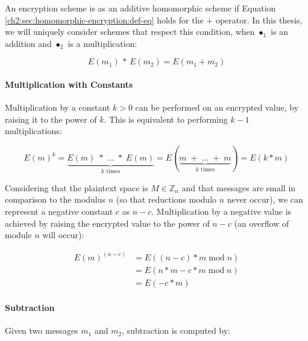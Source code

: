 \begin{definition}\label{ch2:definition:he-additive} An encryption scheme is as an additive homomorphic scheme if Equation \ref{ch2:sec:homomorphic-encryption:def-eq} holds for the $+$ operator. In this thesis, we will uniquely consider schemes that respect this condition, when $\bullet_1$ is an addition and $\bullet_2$ is a multiplication:

\begin{equation}\label{ch2:sec:homomorphic-encryption:def-eq-additive}
    E(m_{1}) \, * \, E(m_{2}) = E(m_{1} + m_{2})
\end{equation}

\paragraph{Multiplication with Constants} Multiplication by a constant $k > 0$ can be performed on an encrypted value, by raising it to the power of $k$. This is equivalent to performing $k - 1$ multiplications:

\begin{equation}\label{ch2:sec:homomorphic-encryption:def-eq-additive-mul-positive}
    E(m)^k = \underbrace{E(m) \; * \; ... \; *  \; E(m)}_{k \text{ times}} = E(\underbrace{m \; + \; ... \; + \; m}_{k \text{ times}}) = E(k * m)
\end{equation}

Considering that the plaintext space is $M \in \mathbb{Z}_n$ and that messages are small in comparison to the modulus $n$ (so that reductions modulo $n$ never occur), we can represent a negative constant $c$ as $n - c$. Multiplication by a negative value is achieved by raising the encrypted value to the power of $n - c$ (an overflow of module $n$ will occur)\autocite{Franz2011-sm}:

\begin{equation}\label{ch2:sec:homomorphic-encryption:def-eq-additive-mul-negative}
    \begin{split}
        E(m)^{(n - c)} &=  E((n - c)* m \; \textrm{mod} \; n) \\ 
        &=  E(n * m - c * m \; \textrm{mod} \; n)\\ 
        &=  E(-c * m)
    \end{split}
\end{equation}

\paragraph{Subtraction} Given two messages $m_1$ and $m_2$, subtraction is computed by:


\end{definition}
